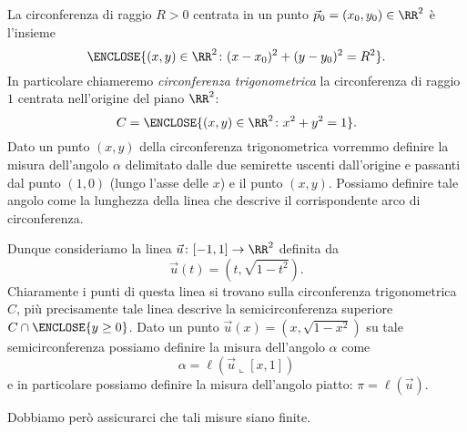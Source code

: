     La circonferenza di raggio $R>0$ centrata in un punto $\vec p_0 = (x_0,y_0)\in \RR^2$ 
    è l'insieme 
    \[
     \ENCLOSE{(x,y) \in \RR^2\colon (x-x_0)^2 + (y-y_0)^2 = R^2}.  
    \]
    In particolare chiameremo \emph{circonferenza trigonometrica} la circonferenza 
    di raggio $1$ centrata nell'origine del piano $\RR^2$:
    \[
     C = \ENCLOSE{(x,y)\in \RR^2 \colon x^2 + y^2 = 1}.  
    \]
    Dato un punto $(x,y)$ della circonferenza trigonometrica vorremmo definire 
    la misura dell'angolo $\alpha$ delimitato dalle due semirette uscenti dall'origine 
    e passanti dal punto $(1,0)$ (lungo l'asse delle $x$) e il punto $(x,y)$.
    Possiamo definire tale angolo come la lunghezza della linea che descrive il corrispondente 
    arco di circonferenza.
    
    Dunque consideriamo la linea $\vec u\colon [-1,1]\to \RR^2$ definita da
    \[
      \vec u(t) = (t,\sqrt{1-t^2}).
    \]
    Chiaramente i punti di questa linea si trovano sulla circonferenza trigonometrica $C$, 
    più precisamente tale linea descrive la semicirconferenza superiore $C\cap\ENCLOSE{y\ge 0}$.
    Dato un punto $\vec u(x) = (x,\sqrt{1-x^2})$ su tale semicirconferenza possiamo definire la 
    misura dell'angolo $\alpha$ come 
    \[
      \alpha = \ell(\vec u\llcorner [x,1])
    \]
    e in particolare possiamo definire la misura dell'angolo piatto: 
    $\pi = \ell(\vec u)$.
    \mymargin{$\pi$}%
    
    Dobbiamo però assicurarci che tali misure siano finite.
    
